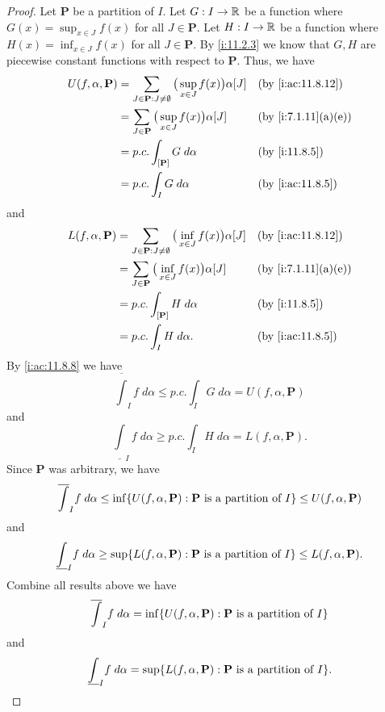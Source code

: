 \begin{proof}
  Let \(\mathbf{P}\) be a partition of \(I\).
  Let \(G : I \to \mathbb{R}\) be a function where \(G(x) = \sup_{x \in J} f(x)\) for all \(J \in \mathbf{P}\).
  Let \(H : I \to \mathbb{R}\) be a function where \(H(x) = \inf_{x \in J} f(x)\) for all \(J \in \mathbf{P}\).
  By \cref{i:11.2.3} we know that \(G, H\) are piecewise constant functions with respect to \(\mathbf{P}\).
  Thus, we have
  \begin{align*}
    U(f, \alpha, \mathbf{P}) & = \sum_{J \in \mathbf{P} : J \neq \emptyset} \big(\sup_{x \in J} f(x)\big) \alpha[J] &  & \by{i:ac:11.8.12}  \\
                             & = \sum_{J \in \mathbf{P}} \big(\sup_{x \in J} f(x)\big) \alpha[J]                    &  & \by{i:7.1.11}[a,e] \\
                             & = p.c. \int_{[\mathbf{P}]} G \; d \alpha                                             &  & \by{i:11.8.5}      \\
                             & = p.c. \int_I G \; d \alpha                                                          &  & \by{i:ac:11.8.5}
  \end{align*}
  and
  \begin{align*}
    L(f, \alpha, \mathbf{P}) & = \sum_{J \in \mathbf{P} : J \neq \emptyset} \big(\inf_{x \in J} f(x)\big) \alpha[J] &  & \by{i:ac:11.8.12}  \\
                             & = \sum_{J \in \mathbf{P}} \big(\inf_{x \in J} f(x)\big) \alpha[J]                    &  & \by{i:7.1.11}[a,e] \\
                             & = p.c. \int_{[\mathbf{P}]} H \; d \alpha                                             &  & \by{i:11.8.5}      \\
                             & = p.c. \int_I H \; d \alpha.                                                         &  & \by{i:ac:11.8.5}
  \end{align*}
  By \cref{i:ac:11.8.8} we have
  \[
    \overline{\int}_I f \; d \alpha \leq p.c. \int_I G \; d \alpha = U(f, \alpha, \mathbf{P})
  \]
  and
  \[
    \underline{\int}_I f \; d \alpha \geq p.c. \int_I H \; d \alpha = L(f, \alpha, \mathbf{P}).
  \]
  Since \(\mathbf{P}\) was arbitrary, we have
  \[
    \overline{\int}_I f \; d \alpha \leq \inf\set{U(f, \alpha, \mathbf{P}) : \mathbf{P} \text{ is a partition of } I} \leq U(f, \alpha, \mathbf{P})
  \]
  and
  \[
    \underline{\int}_I f \; d \alpha \geq \sup\set{L(f, \alpha, \mathbf{P}) : \mathbf{P} \text{ is a partition of } I} \leq L(f, \alpha, \mathbf{P}).
  \]
  Combine all results above we have
  \[
    \overline{\int}_I f \; d \alpha = \inf\set{U(f, \alpha, \mathbf{P}) : \mathbf{P} \text{ is a partition of } I}
  \]
  and
  \[
    \underline{\int}_I f \; d \alpha = \sup\set{L(f, \alpha, \mathbf{P}) : \mathbf{P} \text{ is a partition of } I}.
  \]
\end{proof}

